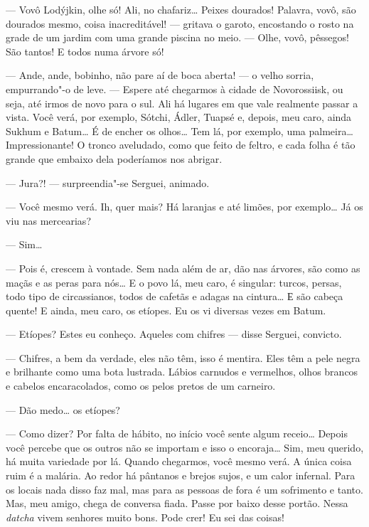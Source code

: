 --- Vovô Lodýjkin, olhe só! Ali, no chafariz\ldots{} Peixes dourados!
Palavra, vovô, são dourados mesmo, coisa inacreditável! --- gritava o
garoto, encostando o rosto na grade de um jardim com uma grande piscina
no meio. --- Olhe, vovô, pêssegos! São tantos! E todos numa árvore só!

--- Ande, ande, bobinho, não pare aí de boca aberta! --- o velho sorria,
empurrando"-o de leve. --- Espere até chegarmos à cidade de Novorossiisk,
ou seja, até irmos de novo para o sul. Ali há lugares em que vale
realmente passar a vista. Você verá, por exemplo, Sótchi, Ádler, Tuapsé
e, depois, meu caro, ainda Sukhum e Batum\ldots{} É de encher os olhos\ldots{} Tem
lá, por exemplo, uma palmeira\ldots{} Impressionante! O tronco aveludado, como
que feito de feltro, e cada folha é tão grande que embaixo dela
poderíamos nos abrigar.

--- Jura?! --- surpreendia"-se Serguei, animado.

--- Você mesmo verá. Ih, quer mais? Há laranjas e até limões, por
exemplo\ldots{} Já os viu nas mercearias?

--- Sim\ldots{}

--- Pois é, crescem à vontade. Sem nada além de ar, dão nas árvores, são
como as maçãs e as peras para nós\ldots{} E o povo lá, meu caro, é singular:
turcos, persas, todo tipo de circassianos, todos de cafetãs e adagas na
cintura\ldots{} Е são cabeça quente! E ainda, meu caro, os etíopes. Eu os vi
diversas vezes em Batum.

--- Etíopes? Estes eu conheço. Aqueles com chifres --- disse Serguei,
convicto.

--- Chifres, a bem da verdade, eles não têm, isso é mentira. Eles têm a
pele negra e brilhante como uma bota lustrada. Lábios carnudos e
vermelhos, olhos brancos e cabelos encaracolados, como os pelos pretos
de um carneiro.

--- Dão medo\ldots{} os etíopes?

--- Como dizer? Por falta de hábito, no início você sente algum
receio\ldots{} Depois você percebe que os outros não se importam e isso o
encoraja\ldots{} Sim, meu querido, há muita variedade por lá. Quando
chegarmos, você mesmo verá. A única coisa ruim é a malária. Ao redor há
pântanos e brejos sujos, e um calor infernal. Para os locais nada disso faz mal, mas para as pessoas de fora é um sofrimento e tanto. Mas,
meu amigo, chega de conversa fiada. Passe por baixo desse portão. Nessa
\emph{datcha} vivem senhores muito bons. Pode crer! Eu sei das coisas!

